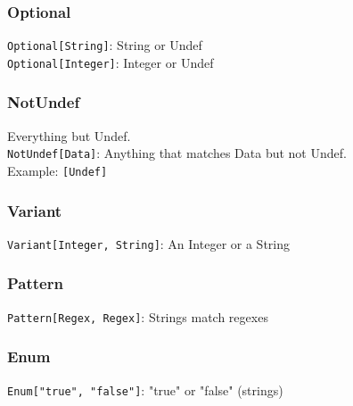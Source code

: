 \begin{frame}\frametitle{Optional}
    \begin{center}
\LARGE
\texttt{Optional[String]}: String or Undef\\
\texttt{Optional[Integer]}: Integer or Undef
    \end{center}
\end{frame}
\begin{frame}\frametitle{NotUndef}
    \begin{center}
\LARGE
Everything but Undef.\\
\texttt{NotUndef[Data]}: Anything that matches Data but not Undef.\\
Example: \texttt{[Undef]}
    \end{center}
\end{frame}
\begin{frame}\frametitle{Variant}
    \begin{center}
\LARGE
\texttt{Variant[Integer, String]}: An Integer or a String
    \end{center}
\end{frame}
\begin{frame}\frametitle{Pattern}
    \begin{center}
\LARGE
\texttt{Pattern[Regex, Regex]}: Strings match regexes
    \end{center}
\end{frame}
\begin{frame}\frametitle{Enum}
    \begin{center}
\LARGE
\texttt{Enum["true", "false"]}: "true" or "false" (strings)
    \end{center}
\end{frame}

